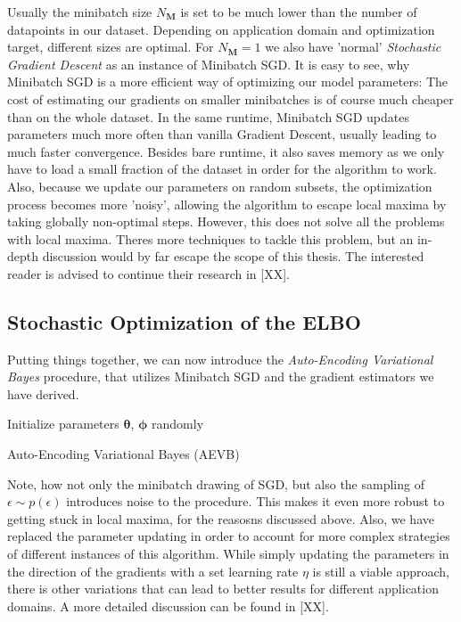 \documentclass[12pt]{report}
\theoremstyle{definition}
\begin{document}
Usually the minibatch size $N_{\mathbf{M}}$ is set to be much lower than the number of datapoints in our dataset. Depending on application domain and optimization target, different sizes are optimal. For $N_\mathbf{M}=1$ we also have 'normal' \emph{Stochastic Gradient Descent} as an instance of Minibatch SGD. It is easy to see, why Minibatch SGD is a more efficient way of optimizing our model parameters: The cost of estimating our gradients on smaller minibatches is of course much cheaper than on the whole dataset. In the same runtime, Minibatch SGD updates parameters much more often than vanilla Gradient Descent, usually leading to much faster convergence. Besides bare runtime, it also saves memory as we only have to load a small fraction of the dataset in order for the algorithm to work. Also, because we update our parameters on random subsets, the optimization process becomes more 'noisy', allowing the algorithm to escape local maxima by taking globally non-optimal steps. However, this does not solve all the problems with local maxima. Theres more techniques to tackle this problem, but an in-depth discussion would by far escape the scope of this thesis. The interested reader is advised to continue their research in [XX].

\subsection{Stochastic Optimization of the ELBO}
Putting things together, we can now introduce the \emph{Auto-Encoding Variational Bayes} procedure, that utilizes Minibatch SGD and the gradient estimators we have derived.

\begin{algorithm}[H]
\SetAlgoLined
Initialize parameters $\pmb{\theta}$, $\pmb{\phi}$ randomly\\
\caption{Auto-Encoding Variational Bayes (AEVB)}
\end{algorithm}
Note, how not only the minibatch drawing of SGD, but also the sampling of $\epsilon \sim p(\epsilon)$ introduces noise to the procedure. This makes it even more robust to getting stuck in local maxima, for the reasosns discussed above. Also, we have replaced the parameter updating in order to account for more complex strategies of different instances of this algorithm. While simply updating the parameters in the direction of the gradients with a set learning rate $\eta$ is still a viable approach, there is other variations that can lead to better results for different application domains. A more detailed discussion can be found in [XX].
\end{document}
